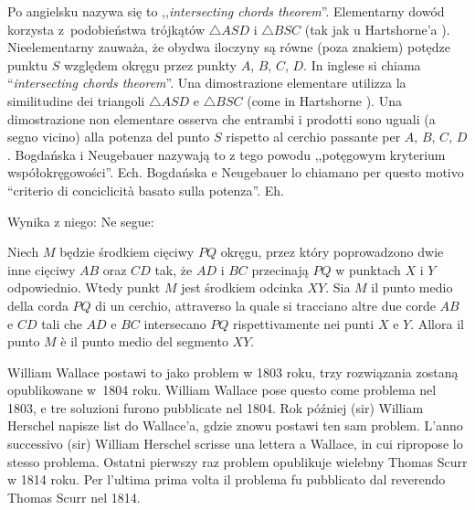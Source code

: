 Po angielsku nazywa się to ,,\emph{intersecting chords theorem}''. %
Elementarny dowód korzysta z~podobieństwa trójkątów $\triangle ASD$ i $\triangle BSC$ (tak jak u Hartshorne'a \cite[s. 180]{hartshorne_2000}). %
Nieelementarny zauważa, że obydwa iloczyny są równe (poza znakiem) potędze punktu $S$ względem okręgu przez punkty $A$, $B$, $C$, $D$. %
In inglese si chiama ``\emph{intersecting chords theorem}''. %
Una dimostrazione elementare utilizza la similitudine dei triangoli $\triangle ASD$ e $\triangle BSC$ (come in Hartshorne \cite[p. 180]{hartshorne_2000}). %
Una dimostrazione non elementare osserva che entrambi i prodotti sono uguali (a segno vicino) alla potenza del punto $S$ rispetto al cerchio passante per $A$, $B$, $C$, $D$. %
Bogdańska i Neugebauer nazywają to z tego powodu ,,potęgowym kryterium współokręgowości''. %
Ech. %
Bogdańska e Neugebauer lo chiamano per questo motivo ``criterio di conciclicità basato sulla potenza''. %
Eh. %

Wynika z niego: %
Ne segue: %

\begin{proposition}
[twierdzenie o motylku] %
[teorema della farfalla] %
Niech $M$ będzie środkiem cięciwy $PQ$ okręgu, przez który poprowadzono dwie inne cięciwy $AB$ oraz $CD$ tak, że $AD$ i $BC$ przecinają $PQ$ w punktach $X$ i $Y$ odpowiednio. %
Wtedy punkt $M$ jest środkiem odcinka $XY$. %
Sia $M$ il punto medio della corda $PQ$ di un cerchio, attraverso la quale si tracciano altre due corde $AB$ e $CD$ tali che $AD$ e $BC$ intersecano $PQ$ rispettivamente nei punti $X$ e $Y$. %
Allora il punto $M$ è il punto medio del segmento $XY$. %
\end{proposition}

William Wallace postawi to jako problem w 1803 roku, trzy rozwiązania zostaną opublikowane w~1804 roku. %
William Wallace pose questo come problema nel 1803, e tre soluzioni furono pubblicate nel 1804. %
%
Rok później (sir) William Herschel napisze list do Wallace'a, gdzie znowu postawi ten sam problem. %
L'anno successivo (sir) William Herschel scrisse una lettera a Wallace, in cui ripropose lo stesso problema. %
%
Ostatni pierwszy raz problem opublikuje wielebny Thomas Scurr w 1814 roku. %
Per l'ultima prima volta il problema fu pubblicato dal reverendo Thomas Scurr nel 1814. %
%

